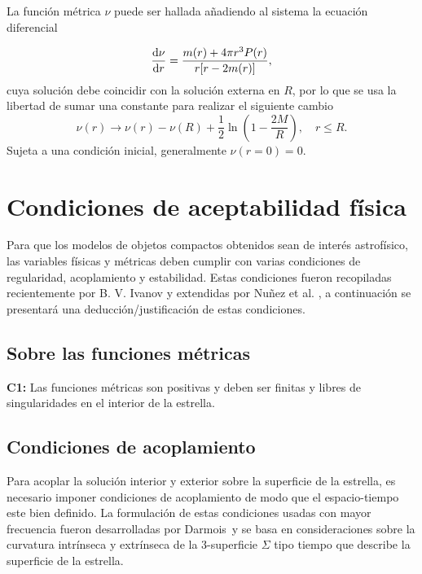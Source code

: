 La función métrica $\nu$ puede ser hallada añadiendo al sistema la ecuación diferencial

\begin{equation}
    \dv{\nu}{r} = \frac { m ( r ) + 4 \pi r ^ { 3 } P ( r ) } { r [ r - 2 m ( r ) ] },
\end{equation}
cuya solución debe coincidir con la solución externa en $R$, por lo que se usa la libertad de sumar una constante para realizar el siguiente cambio
\begin{equation}
    \nu ( r ) \longrightarrow \nu ( r ) - \nu ( R ) + \frac { 1 } { 2 } \ln \left( 1 - \frac { 2 M } { R } \right) , \quad r \leq R.
\end{equation}
Sujeta a una condición inicial, generalmente $\nu(r=0)=0$.



\section{Condiciones de aceptabilidad física}
Para que los modelos de objetos compactos obtenidos sean de interés astrofísico, las variables físicas y métricas deben cumplir con varias condiciones de regularidad, acoplamiento y estabilidad. Estas condiciones fueron recopiladas recientemente por B. V. Ivanov \cite{Ivanov2017} y extendidas por Nuñez et al. \cite{Hernandez2018}, a continuación se presentará una deducción/justificación de estas condiciones. 

\subsection*{Sobre las funciones métricas}
\textbf{C1:} Las funciones métricas son positivas y deben ser finitas y libres de singularidades en el interior de la estrella.
\subsection*{Condiciones de acoplamiento}
 Para acoplar la solución interior y exterior sobre la superficie de la estrella, es necesario imponer condiciones de acoplamiento de modo que el espacio-tiempo este bien definido. 
 La formulación de estas condiciones usadas con mayor frecuencia fueron desarrolladas por Darmois\, y se basa en consideraciones sobre la curvatura intrínseca y extrínseca de la 3-superficie $\Sigma$ tipo tiempo que describe la superficie de la estrella.
 
